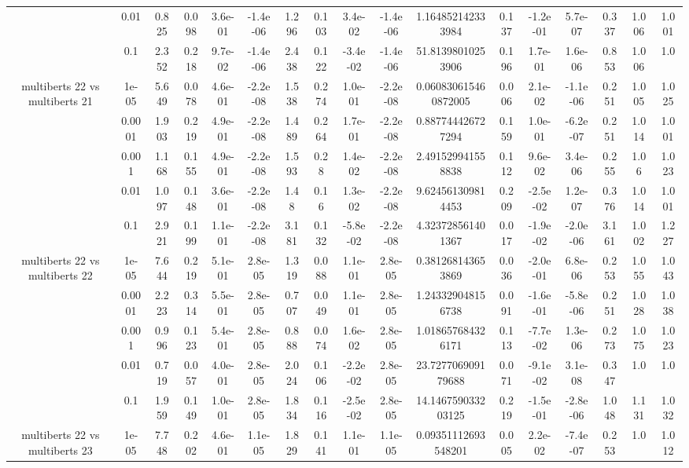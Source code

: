 \begin{tabular}{|c|c|c|c|c|c|c|c|c|c|c|c|c|c|c|c|c|}
 & 0.01 & 0.825 & 0.098 & 3.6e-01 & -1.4e-06 & 1.296 & 0.103 & 3.4e-02 & -1.4e-06 & 1.164852142333984 & 0.137 & -1.2e-01 & 5.7e-07 & 0.337 & 1.006 & 1.001 \\
 & 0.1 & 2.352 & 0.218 & 9.7e-02 & -1.4e-06 & 2.438 & 0.122 & -3.4e-02 & -1.4e-06 & 51.81398010253906 & 0.196 & 1.7e-01 & 1.6e-06 & 0.853 & 1.006 & 1.0 \\
\hline
\multirow{5}{*}{multiberts 22 vs multiberts 21} & 1e-05 & 5.649 & 0.078 & 4.6e-01 & -2.2e-08 & 1.538 & 0.274 & 1.0e-01 & -2.2e-08 & 0.060830615460872005 & 0.006 & 2.1e-02 & -1.1e-06 & 0.251 & 1.005 & 1.025 \\
 & 0.0001 & 1.903 & 0.219 & 4.9e-01 & -2.2e-08 & 1.489 & 0.264 & 1.7e-01 & -2.2e-08 & 0.887744426727294 & 0.159 & 1.0e-01 & -6.2e-07 & 0.251 & 1.014 & 1.001 \\
 & 0.001 & 1.168 & 0.155 & 4.9e-01 & -2.2e-08 & 1.593 & 0.28 & 1.4e-02 & -2.2e-08 & 2.491529941558838 & 0.112 & 9.6e-02 & 3.4e-06 & 0.255 & 1.06 & 1.023 \\
 & 0.01 & 1.097 & 0.148 & 3.6e-01 & -2.2e-08 & 1.48 & 0.16 & 1.3e-02 & -2.2e-08 & 9.624561309814453 & 0.209 & -2.5e-02 & 1.2e-07 & 0.376 & 1.014 & 1.001 \\
 & 0.1 & 2.921 & 0.199 & 1.1e-01 & -2.2e-08 & 3.181 & 0.132 & -5.8e-02 & -2.2e-08 & 4.323728561401367 & 0.017 & -1.9e-02 & -2.0e-06 & 3.161 & 1.002 & 1.227 \\
\hline
\multirow{5}{*}{multiberts 22 vs multiberts 22} & 1e-05 & 7.644 & 0.219 & 5.1e-01 & 2.8e-05 & 1.319 & 0.088 & 1.1e-01 & 2.8e-05 & 0.381268143653869 & 0.036 & -2.0e-01 & 6.8e-06 & 0.253 & 1.055 & 1.043 \\
 & 0.0001 & 2.223 & 0.314 & 5.5e-01 & 2.8e-05 & 0.707 & 0.049 & 1.1e-01 & 2.8e-05 & 1.243329048156738 & 0.091 & -1.6e-01 & -5.8e-06 & 0.251 & 1.028 & 1.038 \\
 & 0.001 & 0.996 & 0.123 & 5.4e-01 & 2.8e-05 & 0.888 & 0.074 & 1.6e-02 & 2.8e-05 & 1.018657684326171 & 0.113 & -7.7e-02 & 1.3e-06 & 0.273 & 1.075 & 1.023 \\
 & 0.01 & 0.719 & 0.057 & 4.0e-01 & 2.8e-05 & 2.024 & 0.106 & -2.2e-02 & 2.8e-05 & 23.727706909179688 & 0.071 & -9.1e-02 & 3.1e-08 & 0.347 & 1.0 & 1.0 \\
 & 0.1 & 1.959 & 0.149 & 1.0e-01 & 2.8e-05 & 1.834 & 0.116 & -2.5e-02 & 2.8e-05 & 14.146759033203125 & 0.219 & -1.5e-01 & -2.8e-06 & 1.048 & 1.131 & 1.032 \\
\hline
\multirow{5}{*}{multiberts 22 vs multiberts 23} & 1e-05 & 7.748 & 0.202 & 4.6e-01 & 1.1e-05 & 1.829 & 0.141 & 1.1e-01 & 1.1e-05 & 0.09351112693548201 & 0.005 & 2.2e-02 & -7.4e-07 & 0.253 & 1.0 & 1.012 \\

\end{tabular}
